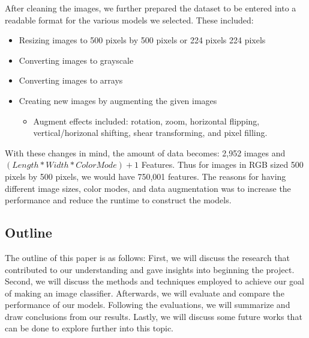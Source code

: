 After cleaning the images, we further prepared the dataset to be entered into a readable format for the various models we selected. These included:
\begin{itemize}
    \item Resizing images to 500 pixels by 500 pixels or 224 pixels 224 pixels
    \item Converting images to grayscale
    \item Converting images to arrays
    \item Creating new images by augmenting the given images
    \begin{itemize} 
        \item Augment effects included: rotation, zoom, horizontal flipping, vertical/horizonal shifting, shear transforming, and pixel filling.
    \end{itemize}
\end{itemize}

With these changes in mind, the amount of data becomes: 2,952 images and $(Length * Width * Color Mode) + 1$ Features. 
Thus for images in RGB sized 500 pixels by 500 pixels, we would have 750,001 features.
The reasons for having different image sizes, color modes, and data augmentation was to increase the performance and reduce the runtime to construct the models.

\subsection{Outline}
The outline of this paper is as follows: First, we will discuss the research that contributed to our understanding and gave insights into beginning the project.
Second, we will discuss the methods and techniques employed to achieve our goal of making an image classifier.
Afterwards, we will evaluate and compare the performance of our models.
Following the evaluations, we will summarize and draw conclusions from our results.
Lastly, we will discuss some future works that can be done to explore further into this topic.